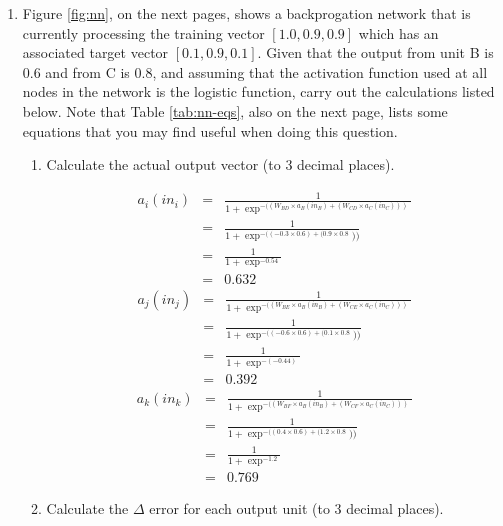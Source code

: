 \documentclass[solution]{ditpaper}
\begin{document}
\begin{enumerate}
		\item Figure \ref{fig:nn}, on the next pages, shows a backprogation network that is currently processing the training vector $[1.0, 0.9, 0.9]$ which has an  associated target vector $[0.1, 0.9, 0.1]$. Given that the output from unit B is $0.6$ and from C is $0.8$, and assuming that the activation function used at all nodes in the network is the logistic function, carry out the calculations listed below. Note that Table \ref{tab:nn-eqs}, also on the next page, lists some equations that you may find useful when doing this question. 
\begin{enumerate}
	\item Calculate the actual output vector (to 3 decimal places).
		\begin{answer}
		\begin{eqnarray*}
		a_i(in_i) &=&\frac{1}{1 + \exp^{- ((W_{BD} \times a_B(in_B) + (W_{CD} \times a_C(in_C) ))}}\\
		&=&\frac{1}{1 + \exp^{- ((-0.3 \times 0.6) + (0.9 \times 0.8}))}\\
		&=&\frac{1}{1 + \exp^{- 0.54}}\\
		&=&0.632
		\end{eqnarray*}
		\begin{eqnarray*}
		a_j(in_j) &=&\frac{1}{1 + \exp^{- ((W_{BE} \times a_B(in_B) + (W_{CE} \times a_C(in_C) ))}}\\
		& = &\frac{1}{1 + \exp^{- ((-0.6 \times 0.6) + (0.1 \times 0.8}))}\\
		& = &\frac{1}{1 + \exp^{- (-0.44)}}\\
		& = &0.392
		\end{eqnarray*}
		\begin{eqnarray*}
		a_k(in_k) &=&\frac{1}{1 + \exp^{- ((W_{BF} \times a_B(in_B) + (W_{CF} \times a_C(in_C) ))}}\\
		& = &\frac{1}{1 + \exp^{- ((0.4 \times 0.6) + (1.2 \times 0.8}))}\\
		& = &\frac{1}{1 + \exp^{- 1.2}}\\
		& = &0.769
		\end{eqnarray*}
		\end{answer}
	\item Calculate the \textbf{$\Delta$} error for each output unit (to 3 decimal places).

\end{enumerate}
\end{enumerate}
\end{document}
